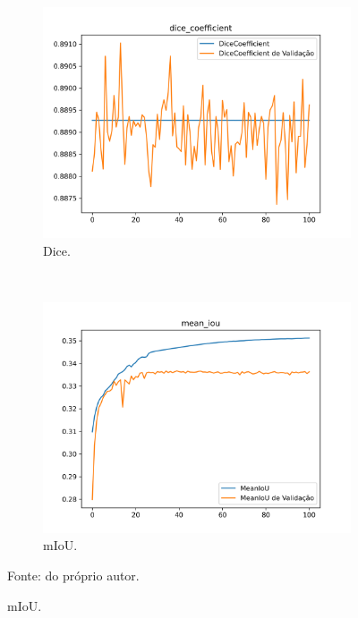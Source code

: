 \begin{figure}[H]
     \begin{subfigure}[t]{0.45\textwidth}
         \centering
         \includegraphics[width=1\linewidth]{recursos/imagens/results/max_unet500_miou_dice_coefficient.png}
         \caption{Dice.}
         \label{results:fig:semantic:metrics3.3}
     \end{subfigure}
     ~
     \begin{subfigure}[t]{0.45\textwidth}
         \centering
         \includegraphics[width=1\linewidth]{recursos/imagens/results/max_unet500_miou_mean_iou.png}
         \caption{mIoU.}
         \label{results:fig:semantic:metrics3.4}
     \end{subfigure}
     
     Fonte: do próprio autor.
\end{figure}

